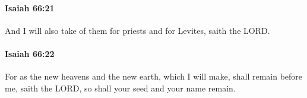 		\paragraph{Isaiah 66:21} %
			\label{ISAIAH-66-21}

			And I will also take of them for priests and for Levites, saith the LORD.


		\paragraph{Isaiah 66:22} %
			\label{ISAIAH-66-22}

			For as the new heavens and the new earth, which I will make, shall remain before me, saith the LORD, so shall your seed and your name remain.


